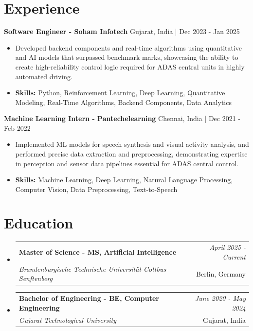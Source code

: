 \documentclass[a4paper,11pt]{article}
\makeatletter
\newcommand{\resumeSubheading}[4]{
\vspace{0.5mm}\item
    \begin{tabular*}{\linewidth}[t]{l@{\extracolsep{\fill}}r}
        \textbf{#1} & \textit{\footnotesize{#4}} \\
        \textit{\footnotesize{#3}} &  \footnotesize{#2}\\
    \end{tabular*}
    \vspace{-2.4mm}
}
\makeatother
\begin{document}
\section{\textbf{Experience}}


\vspace{1mm}
  \textbf{Software Engineer - Soham Infotech} \hfill Gujarat, India | Dec 2023 - Jan 2025
\vspace{-1.5mm} %
\begin{itemize}
  \item Developed backend components and real-time algorithms using quantitative and AI models that surpassed benchmark marks, showcasing the ability to create high-reliability control logic required for ADAS central units in highly automated driving.

\vspace{-2mm}
  \item \textbf{Skills:} Python, Reinforcement Learning, Deep Learning, Quantitative Modeling, Real-Time Algorithms, Backend Components, Data Analytics
\end{itemize}

\vspace{1mm}
  \textbf{Machine Learning Intern - Pantechelearning} \hfill Chennai, India | Dec 2021 - Feb 2022
\vspace{-1.5mm} %
\begin{itemize}
  \item Implemented ML models for speech synthesis and visual activity analysis, and performed precise data extraction and preprocessing, demonstrating expertise in perception and sensor data pipelines essential for ADAS central control.
\vspace{-2mm}
  \item \textbf{Skills:} Machine Learning, Deep Learning, Natural Language Processing, Computer Vision, Data Preprocessing, Text-to-Speech
\end{itemize}\section{\textbf{Education}}
\vspace{-0.4mm}

\begin{itemize}[leftmargin=0.15in, label={}]
\resumeSubheading
{Master of Science - MS, Artificial Intelligence }{Berlin, Germany}
{Brandenburgische Technische Universität Cottbus-Senftenberg  }{April 2025 - Current}

\vspace{1.0mm} %
\resumeSubheading
{Bachelor of Engineering - BE, Computer Engineering  }{Gujarat, India}
{Gujarat Technological University }{June 2020 - May 2024}

\end{itemize}
\end{document}
